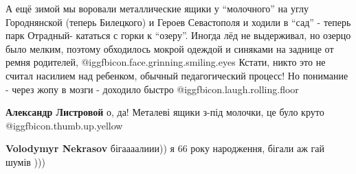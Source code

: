 \begin{itemize}
\begin{itemize}
А ещё зимой мы воровали металлические ящики у \enquote{молочного} на углу
Городнянской (теперь Билецкого) и Героев Севастополя и ходили в \enquote{сад} -
теперь парк Отрадный- кататься с горки к \enquote{озеру}. Иногда лёд не
выдерживал, но озерцо было мелким, поэтому обходилось мокрой одеждой и синяками
на заднице от ремня родителей, @igg{fbicon.face.grinning.smiling.eyes}  Кстати,
никто это не считал насилием над ребенком, обычный педагогический процесс! Но
понимание - через жопу в мозги - доходило быстро
@igg{fbicon.laugh.rolling.floor} 

\textbf{Александр Листровой} о, да! Металеві ящики з-під молочки, це було круто  @igg{fbicon.thumb.up.yellow} 
\end{itemize} %

\textbf{Volodymyr Nekrasov} бігаааалиии)) я 66 року народження, бігали аж гай шумів )))

\end{itemize} %
